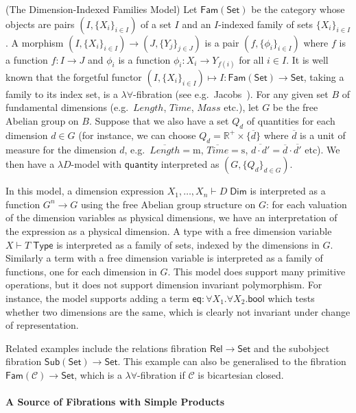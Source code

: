 \documentclass[a4paper,UKenglish]{lipics}
\theoremstyle{plain}
\newcommand{\msf}[1]{\mathsf{#1}} %
\newcommand{\Set}{\msf{Set}}
\newcommand{\Fam}[1]{\msf{Fam}(#1)}
\newcommand{\Sub}[1]{\msf{Sub}(#1)}
\newcommand{\Rel}{\msf{Rel}}
\newcommand{\C}{\mathcal{C}}
\newcommand{\qnt}{\msf{quantity}}
\newcommand{\bool}{\msf{bool}}
\newcommand{\lengthDim}{\mathit{Length}}
\newcommand{\timeDim}{\mathit{Time}}
\newcommand{\massDim}{\mathit{Mass}}
\newcommand{\Tj}[2]{#1 \vdash #2 \; \msf{ Type}}
\newcommand{\Dj}[2]{#1 \vdash #2 \; \msf{ Dim}}
\newcommand{\Dim}{D}
\newcommand{\Dvar}{X}
\begin{document}
\begin{example}(The Dimension-Indexed Families Model)
\label{example:famset}
Let $\Fam\Set$ be the category whose objects are pairs
$(I,\{X_i\}_{i\in I})$ of a set $I$ and an $I$-indexed family of sets
$\{X_i\}_{i\in I}$. A morphism $(I,\{X_i\}_{i\in I}) \to
(J,\{Y_j\}_{j\in J})$ is a pair $(f,\{\phi_i\}_{i\in I})$ where $f$ is
a function $f:I\to J$ and $\phi_i$ is a function $\phi_i:X_i\to
Y_{f(i)}$ for all $i\in I$. It is well known that the forgetful
functor $(I,\{X_i\}_{i\in I}) \mapsto I : \Fam\Set\to \Set$, taking a
family to its index set, is a $\lambda\forall$-fibration (see e.g.\
Jacobs~\cite[Lemma 1.9.5]{jacobs1999categorical}).  For any given set
$B$ of fundamental dimensions (e.g.\ $\lengthDim$, $\timeDim$, $\massDim$ etc.), let $G$ be
the free Abelian group on $B$. Suppose that we also have a set $Q_d$
of quantities for each dimension $d \in G$ (for instance, we can
choose $Q_d = \mathbb R^+ \times \{ \overline{d} \}$ where $\overline{d}$ is
a unit of measure for the dimension $d$, e.g.\
$\overline{\lengthDim} = \mathrm m$, $\overline{\timeDim} = \mathrm s$,
$\overline{d\cdot d'} = \overline{d}\cdot\overline{d'}$ etc). We then
have a $\lambda D$-model with $\qnt$ interpreted as $(G,\{Q_d\}_{d\in
  G})$.

In this model, a dimension expression $\Dj{\Dvar_1,\dots, \Dvar_n}
\Dim$ is interpreted as a function $G^n\to G$ using the free Abelian
group structure on $G$: for each valuation of the dimension variables
as physical dimensions, we have an interpretation of the expression as
a physical dimension. A type with a free dimension variable $\Tj \Dvar
T$ is interpreted as a family of sets, indexed by the dimensions in
$G$. Similarly a term with a free dimension variable is interpreted as
a family of functions, one for each dimension in $G$. This model does
support many primitive operations, but it does not support dimension
invariant polymorphism. For instance, the model supports adding a term
$\mathsf{eq}:\forall \Dvar_1.\forall \Dvar_2.\bool$ which tests
whether two dimensions are the same, which is clearly not invariant
under change of representation.
\end{example}

Related examples include the relations fibration $\Rel \to \Set$ and
the subobject fibration $\Sub{\Set} \to \Set$. This example can also
be generalised to the fibration $\Fam{\C}\to\Set$, which is a
$\lambda\forall$-fibration if $\C$ is bicartesian closed.

\paragraph*{A Source of Fibrations with Simple Products}
\end{document}
